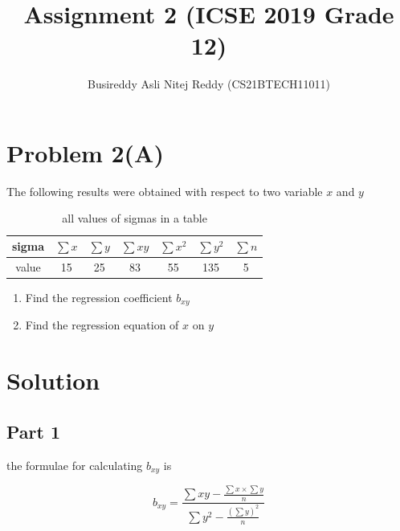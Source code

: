\documentclass[journal,12pt,twocolumn]{IEEEtran}
\title{Assignment 2 (ICSE 2019 Grade 12) }
\author{Busireddy Asli Nitej Reddy (CS21BTECH11011)}
\date{}
\begin{document}
\maketitle



\section*{\textbf{Problem 2(A)}}
The following results were obtained with respect to two variable $x$ and $y$
    \begin{table}[!htb]
        \centering
        \resizebox{\columnwidth}{!} {
          
            \begin{tabular}{|c|c|c|c|c|c|c|}
              \hline
               sigma  &  $\sum x$  &  $\sum y$  &  $\sum xy$  &  $\sum x^{2}$  &  $\sum y^{2}$  & $\sum n$  \\  \hline
               value  &    15      &     25     &     83      &     55         &       135      &     5     \\  
              \hline
            \end{tabular}
            
            }
        \caption{all values of sigmas in a table}
        \label{tab:table}
    \end{table}

    \begin{enumerate}
       \item Find the regression coefficient $b_{xy}$
       \item Find the regression equation of $x$ on $y$
    \end{enumerate}



\section*{\textbf{Solution}}
  
 
 
\subsection*{\textbf{Part 1}}
   
   the formulae for calculating $b_{xy}$ is
   
    \begin{equation}
          \label{eq:b_xy}
          b_{xy}=\frac{\sum xy-\frac{{\sum x}\times  {\sum y}}{n} }{\sum y^{2}-\frac{(\sum y)^{2}}{n} }
    \end{equation}
      
\end{document}
